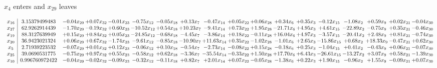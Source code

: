 \documentclass[9pt]{article}
\begin{document}
 $ x_{4} $ enters and $ x_{29} $ leaves 

 \[\begin{array}{c| c c@{\hskip 2pt} c@{\hskip 2pt} c@{\hskip 2pt} c@{\hskip 2pt} c@{\hskip 2pt} c@{\hskip 2pt} c@{\hskip 2pt} c@{\hskip 2pt} c@{\hskip 2pt} c@{\hskip 2pt} c@{\hskip 2pt} c@{\hskip 2pt} c@{\hskip 2pt} c@{\hskip 2pt} c@{\hskip 2pt} c@{\hskip 2pt} }
 x_{16}   &  3.15379499483 & -0.04 x_{29} & +  0.07 x_{32} & -0.01 x_{23} & -0.75 x_{12} & -0.05 x_{18} & +  0.13 x_{7} & -0.47 x_{14} & +  0.05 x_{22} & +  0.06 x_{28} & +  0.34 x_{6} & +  0.35 x_{3} & -0.12 x_{15} & -1.08 x_{2} & +  0.59 x_{9} & +  0.02 x_{21} & -0.04 x_{30}\\
 x_{27}   &  62.9262914439 & -1.70 x_{29} & -0.19 x_{32} & +  0.60 x_{23} & -10.52 x_{12} & +  0.54 x_{18} & + 10.23 x_{7} & -9.41 x_{14} & +  0.73 x_{22} & +  1.95 x_{28} & -21.71 x_{6} & +  4.95 x_{3} & +  4.61 x_{15} & -22.89 x_{2} & -0.75 x_{9} & +  0.35 x_{21} & -0.46 x_{30}\\
 x_{19}   &  88.3127639949 & +  0.15 x_{29} & +  0.84 x_{32} & +  0.05 x_{23} & -24.85 x_{12} & -0.68 x_{18} & -4.45 x_{7} & -3.86 x_{14} & +  0.18 x_{22} & -0.11 x_{28} & + 16.04 x_{6} & +  4.97 x_{3} & -3.57 x_{15} & -20.41 x_{2} & +  2.48 x_{9} & +  0.81 x_{21} & -0.74 x_{30}\\
 x_{20}   &  36.9423021324 & +  0.06 x_{29} & +  0.67 x_{32} & -1.74 x_{23} & -9.61 x_{12} & -0.85 x_{18} & -10.90 x_{7} & + 11.63 x_{14} & +  0.35 x_{22} & -1.02 x_{28} & -1.01 x_{6} & +  2.65 x_{3} & -15.86 x_{15} & +  0.68 x_{2} & + 18.33 x_{9} & -0.47 x_{21} & +  0.62 x_{30}\\
 x_{5}   &  2.71939223532 & -0.07 x_{29} & +  0.01 x_{32} & +  0.12 x_{23} & -0.06 x_{12} & +  0.10 x_{18} & -0.54 x_{7} & -2.73 x_{14} & -0.08 x_{22} & +  0.15 x_{28} & -0.18 x_{6} & +  0.25 x_{3} & -1.04 x_{15} & +  0.41 x_{2} & -0.43 x_{9} & +  0.06 x_{21} & -0.07 x_{30}\\
 x_{25}   &  39.0690531775 & -0.75 x_{29} & +  0.97 x_{32} & +  0.55 x_{23} & -0.58 x_{12} & +  0.62 x_{18} & -3.36 x_{7} & -35.54 x_{14} & -0.33 x_{22} & +  1.50 x_{28} & + 17.70 x_{6} & +  6.43 x_{3} & -26.61 x_{15} & -13.27 x_{2} & +  3.07 x_{9} & +  0.58 x_{21} & -1.39 x_{30}\\
 x_{10}   &  0.996760972422 & -0.04 x_{29} & -0.02 x_{32} & -0.09 x_{23} & -0.32 x_{12} & -0.11 x_{18} & +  0.82 x_{7} & +  2.01 x_{14} & +  0.07 x_{22} & -0.05 x_{28} & -1.38 x_{6} & +  0.22 x_{3} & +  1.90 x_{15} & -0.96 x_{2} & +  1.55 x_{9} & -0.09 x_{21} & +  0.07 x_{30}\\

\end{array}\]
\end{document}
